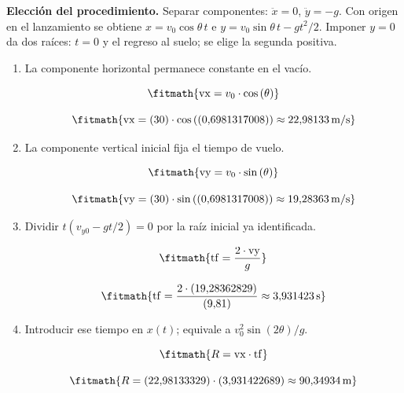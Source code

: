 \noindent\textbf{Elección del procedimiento.} Separar componentes: $\ddot x=0$, $\ddot y=-g$. Con origen en el lanzamiento se obtiene $x=v_0\cos\theta\,t$ e $y=v_0\sin\theta\,t-gt^2/2$. Imponer $y=0$ da dos raíces: $t=0$ y el regreso al suelo; se elige la segunda positiva.

\begin{enumerate}

\item La componente horizontal permanece constante en el vacío.

\[\fitmath{\mathrm{vx}=v_{0}\cdot \cos\left(\theta\right)}\]

\[\fitmath{\mathrm{vx}=(30)\cdot \cos\left((0{,}6981317008)\right)\approx 22{,}98133\,\mathrm{m/s}}\]

\item La componente vertical inicial fija el tiempo de vuelo.

\[\fitmath{\mathrm{vy}=v_{0}\cdot \sin\left(\theta\right)}\]

\[\fitmath{\mathrm{vy}=(30)\cdot \sin\left((0{,}6981317008)\right)\approx 19{,}28363\,\mathrm{m/s}}\]

\item Dividir $t(v_{y0}-gt/2)=0$ por la raíz inicial ya identificada.

\[\fitmath{\mathrm{tf}=\frac{2\cdot \mathrm{vy}}{g}}\]

\[\fitmath{\mathrm{tf}=\frac{2\cdot (19{,}28362829)}{(9{,}81)}\approx 3{,}931423\,\mathrm{s}}\]

\item Introducir ese tiempo en $x(t)$; equivale a $v_0^2\sin(2\theta)/g$.

\[\fitmath{R=\mathrm{vx}\cdot \mathrm{tf}}\]

\[\fitmath{R=(22{,}98133329)\cdot (3{,}931422689)\approx 90{,}34934\,\mathrm{m}}\]

\end{enumerate}
